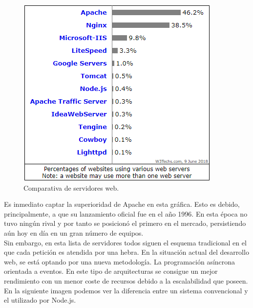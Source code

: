 \begin{figure}[H]
	\centering
	\includegraphics[scale=0.8]{imagenes/web-servers-comparison.png}
	\caption{Comparativa de servidores web.\cite{web-server-usage} \label{fig:figura2}}
\end{figure}

Es inmediato captar la superioridad de Apache\cite{apache} en esta gráfica. Esto es debido, principalmente, a que su lanzamiento 
oficial fue en el año 1996. En esta época no tuvo ningún rival y por tanto se posicionó el primero en el mercado, 
persistiendo aún hoy en día en un gran número de equipos.\\

Sin embargo, en esta lista de servidores todos siguen el esquema tradicional en el que cada petición es atendida 
por una hebra. En la situación actual del desarrollo web, se está optando por una nueva metodología. La programación
asíncrona orientada a eventos. En este tipo de arquitecturas se consigue un mejor rendimiento con un menor coste 
de recursos debido a la escalabilidad que poseen. \\

En la siguiente imagen podemos ver la diferencia entre un sistema convencional y el utilizado por Node.js\cite{nodejs}.

